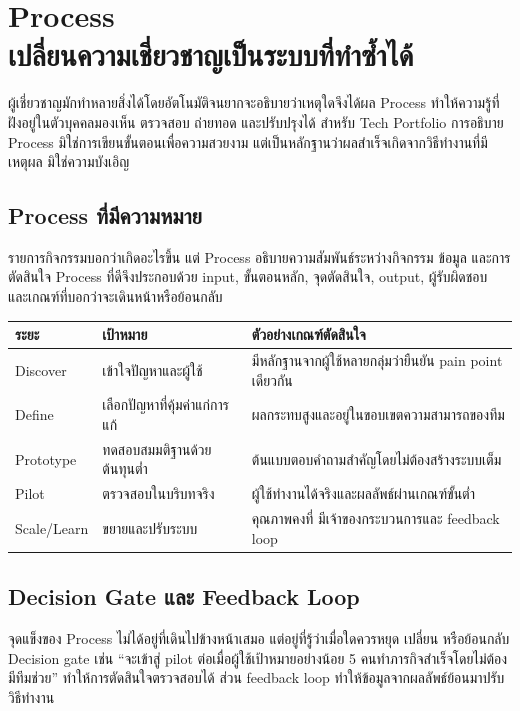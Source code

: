 \chapter{Process\\เปลี่ยนความเชี่ยวชาญเป็นระบบที่ทำซ้ำได้}

ผู้เชี่ยวชาญมักทำหลายสิ่งได้โดยอัตโนมัติจนยากจะอธิบายว่าเหตุใดจึงได้ผล Process ทำให้ความรู้ที่ฝังอยู่ในตัวบุคคลมองเห็น ตรวจสอบ ถ่ายทอด และปรับปรุงได้ สำหรับ Tech Portfolio การอธิบาย Process มิใช่การเขียนขั้นตอนเพื่อความสวยงาม แต่เป็นหลักฐานว่าผลสำเร็จเกิดจากวิธีทำงานที่มีเหตุผล มิใช่ความบังเอิญ


\section{Process ที่มีความหมาย}
รายการกิจกรรมบอกว่าเกิดอะไรขึ้น แต่ Process อธิบายความสัมพันธ์ระหว่างกิจกรรม ข้อมูล และการตัดสินใจ Process ที่ดีจึงประกอบด้วย input, ขั้นตอนหลัก, จุดตัดสินใจ, output, ผู้รับผิดชอบ และเกณฑ์ที่บอกว่าจะเดินหน้าหรือย้อนกลับ

\begin{longtable}{P{.18\textwidth}P{.24\textwidth}P{.45\textwidth}}
\toprule
\textbf{ระยะ} & \textbf{เป้าหมาย} & \textbf{ตัวอย่างเกณฑ์ตัดสินใจ}\\
\midrule
Discover & เข้าใจปัญหาและผู้ใช้ & มีหลักฐานจากผู้ใช้หลายกลุ่มว่ายืนยัน pain point เดียวกัน\\
Define & เลือกปัญหาที่คุ้มค่าแก่การแก้ & ผลกระทบสูงและอยู่ในขอบเขตความสามารถของทีม\\
Prototype & ทดสอบสมมติฐานด้วยต้นทุนต่ำ & ต้นแบบตอบคำถามสำคัญโดยไม่ต้องสร้างระบบเต็ม\\
Pilot & ตรวจสอบในบริบทจริง & ผู้ใช้ทำงานได้จริงและผลลัพธ์ผ่านเกณฑ์ขั้นต่ำ\\
Scale/Learn & ขยายและปรับระบบ & คุณภาพคงที่ มีเจ้าของกระบวนการและ feedback loop\\
\bottomrule
\end{longtable}

\section{Decision Gate และ Feedback Loop}
จุดแข็งของ Process ไม่ได้อยู่ที่เดินไปข้างหน้าเสมอ แต่อยู่ที่รู้ว่าเมื่อใดควรหยุด เปลี่ยน หรือย้อนกลับ Decision gate เช่น \enquote{จะเข้าสู่ pilot ต่อเมื่อผู้ใช้เป้าหมายอย่างน้อย 5 คนทำภารกิจสำเร็จโดยไม่ต้องมีทีมช่วย} ทำให้การตัดสินใจตรวจสอบได้ ส่วน feedback loop ทำให้ข้อมูลจากผลลัพธ์ย้อนมาปรับวิธีทำงาน

